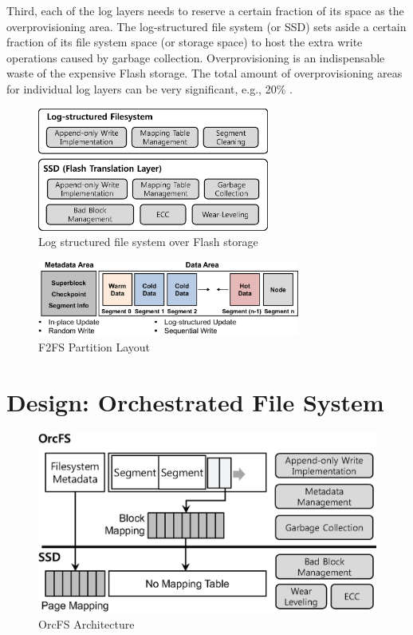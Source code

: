 \documentclass[pageno]{jpaper}
\begin{document}
Third, each of the log layers needs to reserve a certain fraction of its
space as the overprovisioning area. The log-structured file system (or
SSD) sets aside a certain fraction of its file system space (or storage
space) to host the extra write operations caused by garbage
collection. Overprovisioning is an indispensable waste of the expensive
Flash storage. The total amount of overprovisioning areas for individual log
layers can be very significant, e.g., 20$\%$ \cite{sdf}. 


\begin{figure}[t]
\begin{center}
\includegraphics[width=3in]{./figure/layered_log_system}
\caption{Log structured file system over Flash storage}
\label{fig:layered_log_system}
\end{center}
\end{figure}

\begin{figure}[t]
\begin{center}
\includegraphics[width=3.4in]{./figure/f2fs_layout}
\caption{F2FS Partition Layout}
\label{fig:f2fs_partition}
\end{center}
\end{figure}


\section{Design: Orchestrated File System}
\label{sec:OrcFS_design}


\begin{figure}[t]
\begin{center}
\includegraphics[width=3 in]{./figure/usl_architecture}
\caption{OrcFS Architecture}
\label{fig:usl_layout}
\end{center}
\end{figure}
\end{document}
